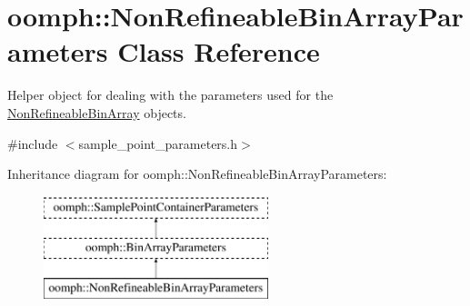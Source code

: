 \hypertarget{classoomph_1_1NonRefineableBinArrayParameters}{}\section{oomph\+:\+:Non\+Refineable\+Bin\+Array\+Parameters Class Reference}
\label{classoomph_1_1NonRefineableBinArrayParameters}


Helper object for dealing with the parameters used for the \hyperlink{classNonRefineableBinArray}{Non\+Refineable\+Bin\+Array} objects.  




{\ttfamily \#include $<$sample\+\_\+point\+\_\+parameters.\+h$>$}

Inheritance diagram for oomph\+:\+:Non\+Refineable\+Bin\+Array\+Parameters\+:\begin{figure}[H]
\begin{center}
\leavevmode
\includegraphics[height=3.000000cm]{classoomph_1_1NonRefineableBinArrayParameters}
\end{center}
\end{figure}
